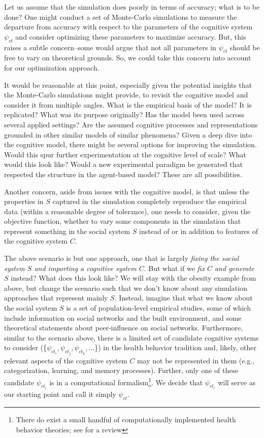 \documentclass{article}
\begin{document}
Let us assume that the simulation does poorly in terms of accuracy; what is to be done?  One might conduct a set of Monte-Carlo simulations to measure the departure from accuracy with respect to the parameters of the cognitive system $\psi_{ct}$ and consider optimizing these parameters to maximize accuracy. But, this raises a subtle concern--some would argue that not all parameters in $\psi_{ct}$ should be free to vary on theoretical grounds\cite{reitter2010}.  So, we could take this concern into account for our optimization approach.  

It would be reasonable at this point, especially given the potential insights that the Monte-Carlo simulations might provide, to revisit the cognitive model and consider it from multiple angles.  What is the empirical basis of the model?  It is replicated?  What was its purpose originally?  Has the model been used across several applied settings?  Are the assumed cognitive processes and representations grounded in other similar models of similar phenomena?  Given a deep dive into the cognitive model, there might be several options for improving the simulation.  Would this spur further experimentation at the cognitive level of scale? What would this look like?  Would a new experimental paradigm be generated that respected the structure in the agent-based model?  These are all possibilities.

Another concern, aside from issues with the cognitive model, is that unless the properties in $S$ captured in the simulation completely reproduce the empirical data (within a reasonable degree of tolerance), one needs to consider, given the objective function, whether to vary some components in the simulation that represent something in the social system $S$ instead of or in addition to features of the cognitive system $C$. 
  
The above scenario is but one approach, one that is largely \textit{fixing the social system $S$ and importing a cognitive system $C$}.  But what if we \textit{fix $C$ and generate $S$} instead?  What does this look like?  We will stay with the obesity example from above, but change the scenario such that we don't know about any simulation approaches that represent mainly $S$.  Instead, imagine that what we know about the social system $S$ is a set of population-level empirical studies, some of which include information on social networks and the built environment, and some theoretical statements about peer-influence on social networks. Furthermore, similar to the scenario above, there is a limited set of candidate cognitive systems to consider (\{$\psi_{ct_i}, \psi_{ct_j}, \psi_{ct_k},...$\}) in the health behavior tradition and, likely, other relevant aspects of the cognitive system $C$ may not be represented in them (e.g., categorization, learning, and memory processes).  Further, only one of these candidate $\psi_{ct_i}$ is in a computational formalism\footnote{There do exist a small handful of computationally implemented health behavior theories; see \cite{orr2017readbook} for a review}.  We decide that $\psi_{ct_i}$ will serve as our starting point and call it simply $\psi_{ct}$.  
\end{document}
